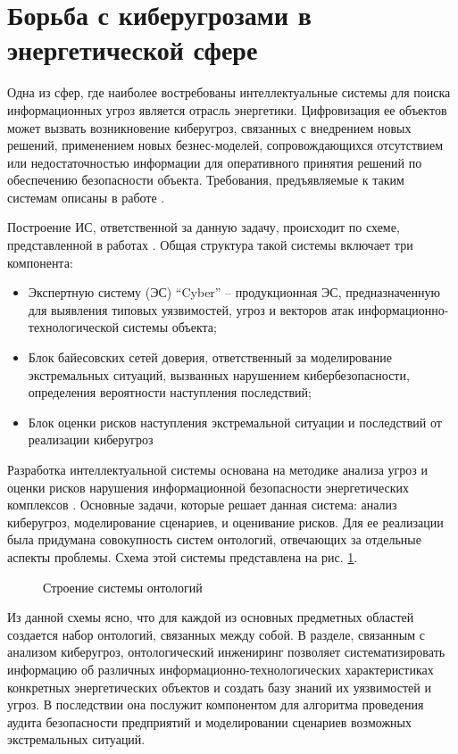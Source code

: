 \section{Борьба с киберугрозами в энергетической сфере}
Одна из сфер, где наиболее востребованы интеллектуальные системы для поиска информационных угроз
является отрасль энергетики. Цифровизация ее объектов может вызвать возникновение киберугроз,
связанных с внедрением новых решений, применением новых безнес-моделей, сопровождающихся отсутствием
или недостаточностью информации для оперативного принятия решений по обеспечению безопасности объекта.
Требования, предъявляемые к таким системам описаны в работе \cite{reqs}.

Построение ИС, ответственной за данную задачу, происходит по схеме, представленной
в работах \cite{scheme, ontoling}.
Общая структура такой системы включает три компонента:
\begin{itemize}
\item
Экспертную систему (ЭС) ``Cyber'' -- продукционная ЭС, предназначенную для выявления типовых уязвимостей,
угроз и векторов атак информационно-технологической системы объекта;
\item
Блок байесовских сетей доверия, ответственный за моделирование экстремальных ситуаций, вызванных нарушением
кибербезопасности, определения вероятности наступления последствий;
\item
Блок оценки рисков наступления экстремальной ситуации и последствий от реализации киберугроз
\end{itemize}

Разработка интеллектуальной системы основана на методике анализа угроз и оценки рисков нарушения
информационной безопасности энергетических комплексов \cite{methods}. Основные задачи, которые решает
данная система: анализ киберугроз, моделирование сценариев, и оценивание рисков.
Для ее реализации была придумана совокупность систем онтологий, отвечающих за отдельные аспекты проблемы.
Схема этой системы представлена на рис. \ref{dio}.

\begin{figure}[h]
    \caption{Строение системы онтологий}
    \label{dio}
\end{figure}

Из данной схемы ясно, что для каждой из основных предметных областей создается набор онтологий, связанных
между собой. В разделе, связанным с анализом киберугроз, онтологический инжениринг позволяет систематизировать
информацию об различных информационно-технологических характеристиках конкретных энергетических объектов
и создать базу знаний их уязвимостей и угроз. В последствии она послужит компонентом для алгоритма проведения
аудита безопасности предприятий и моделировании сценариев возможных экстремальных ситуаций.

